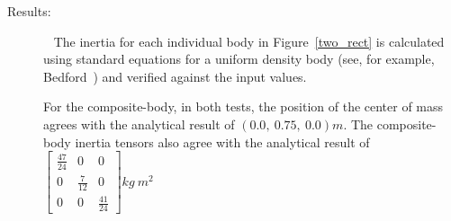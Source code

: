 \begin{description}
\item[Results:]\ \newline
The inertia for each individual body in Figure~\ref{two_rect} is calculated 
using standard equations for a uniform density body (see, 
for example, Bedford~\cite{Bedford}) and verified against the input values.

For the composite-body, in both tests, the position of the center of mass 
agrees with the analytical result of $(0.0,~0.75,~0.0) m$.  The composite-body 
inertia tensors also agree with the analytical result of $\begin{bmatrix} 
\frac{47}{24} & 0 & 0 \\ 0 & \frac{7}{12} & 0 \\ 0 & 0 & \frac{41}{24} 
\end{bmatrix} kg ~ m^2$

\end{description}

\clearpage






